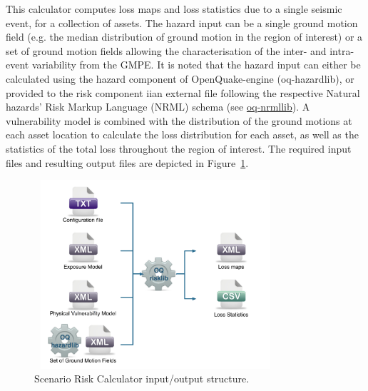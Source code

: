 This calculator computes loss maps and loss statistics due to a single seismic event, for a collection of assets. The hazard input can be a single ground motion field (e.g. the median distribution of ground motion in the region of interest) or a set of ground motion fields allowing the characterisation of the inter- and intra-event variability from the GMPE. It is noted that the hazard input can either be calculated using the hazard component of OpenQuake-engine (oq-hazardlib), or provided to the risk component iian external file following the respective Natural hazards' Risk Markup Language (NRML) schema (see \href{http://github.com/gem/oq-nrmllib}{oq-nrmllib}).
A vulnerability model is combined with the distribution of the ground motions at each asset location to calculate the loss distribution for each asset, as well as the statistics of the total loss throughout the region of interest. The required input files and resulting output files are depicted in Figure~\ref{fig:ScnRisk}.

\begin{figure}[ht]
\centering
\includegraphics[width=9cm,height=7cm]{figures/risk/ScenarioRisk.pdf}
\caption{Scenario Risk Calculator input/output structure.}
\label{fig:ScnRisk}
\end{figure}